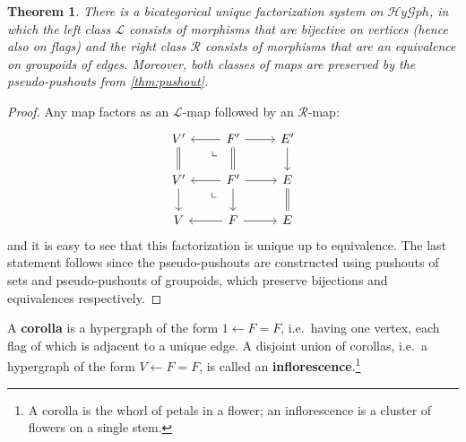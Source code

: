\documentclass{article}
\newtheorem{thm}{Theorem}[section]
\theoremstyle{definition}
\theoremstyle{remark}
\def\L{\mathcal{L}}
\def\R{\mathcal{R}}
\newcommand{\dlpullback}[1][dl]{\ar[#1,phantom,near start,"\llcorner"]}
\let\ot\leftarrow
\def\hy{\mathcal{H}\mathit{y}\mathcal{G}\mathit{ph}}
\begin{document}
\begin{thm}
  There is a bicategorical unique factorization system on $\hy$, in which the left class $\L$ consists of morphisms that are bijective on vertices (hence also on flags) and the right class $\R$ consists of morphisms that are an equivalence on groupoids of edges.
  Moreover, both classes of maps are preserved by the pseudo-pushouts from \cref{thm:pushout}.
\end{thm}
\begin{proof}
  Any map factors as an $\L$-map followed by an $\R$-map:
  \[
  \begin{tikzcd}
    V' \ar[d,equals] & F' \ar[l] \ar[d,equals] \dlpullback \ar[r] & E' \ar[d] \\
    V' \ar[d] & F' \ar[l] \ar[d] \ar[r] \dlpullback & E \ar[d,equals]\\
    V & F \ar[l] \ar[r] & E
  \end{tikzcd}
  \]
  and it is easy to see that this factorization is unique up to equivalence.
  The last statement follows since the pseudo-pushouts are constructed using pushouts of sets and pseudo-pushouts of groupoids, which preserve bijections and equivalences respectively.
\end{proof}

A \textbf{corolla} is a hypergraph of the form $1 \ot F = F$, i.e.\ having one vertex, each flag of which is adjacent to a unique edge.
A disjoint union of corollas, i.e.\ a hypergraph of the form $V \ot F = F$, is called an \textbf{inflorescence}.\footnote{A corolla is the whorl of petals in a flower; an inflorescence is a cluster of flowers on a single stem.}
\end{document}
